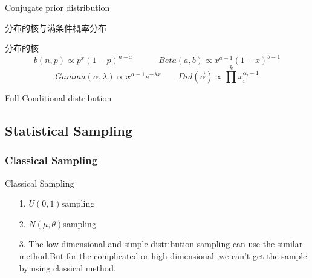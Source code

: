\documentclass{beamer}
\begin{document}
\begin{CJK*}{UTF8}{gbsn}
\begin{frame}{Conjugate prior distribution }
\begin{itemize}
\begin{small}
\end{small}
\end{itemize}
\end{frame}

\begin{frame}{分布的核与满条件概率分布}
\begin{itemize}
\begin{small}
\item 分布的核\[b(n,p)\propto p^x(1-p)^{n-x}\qquad \quad Beta(a,b)\propto x^{a-1}(1-x)^{b-1}\]
	 \[Gamma(\alpha,\lambda)\propto x^{\alpha-1}e^{-\lambda x}\qquad Did(\overrightarrow{\alpha})\propto \prod^kx_i^{\alpha_i-1}
	\]
\item Full Conditional distribution
\end{small}
\end{itemize}
\end{frame}



\subsection{Statistical Sampling}
\subsubsection{Classical Sampling}
\begin{frame}{Classical Sampling}
\begin{center}
\begin{itemize}
\item[1.] $U(0,1)$sampling
\item[2.] $N(\mu,\theta)$sampling
\item[3.] The low-dimensional and simple distribution sampling can use the similar method.But for the complicated or high-dimensional ,we can't get the sample by using classical method.
\end{itemize}
\end{center}
\end{frame}


\end{CJK*}
\end{document}
